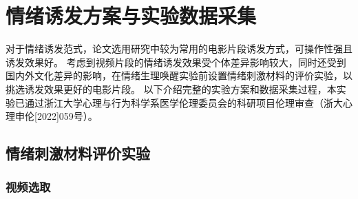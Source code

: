 \clearpage
\section{情绪诱发方案与实验数据采集}
对于情绪诱发范式，论文选用研究中较为常用的电影片段诱发方式，可操作性强且诱发效果好。
考虑到视频片段的情绪诱发效果受个体差异影响较大，同时还受到国内外文化差异的影响，在情绪生理唤醒实验前设置情绪刺激材料的评价实验，以挑选诱发效果更好的电影片段。
以下介绍完整的实验方案和数据采集过程，本实验已通过浙江大学心理与行为科学系医学伦理委员会的科研项目伦理审查（浙大心理申伦[2022]059号）。

\subsection{情绪刺激材料评价实验}
\subsubsection{视频选取}

